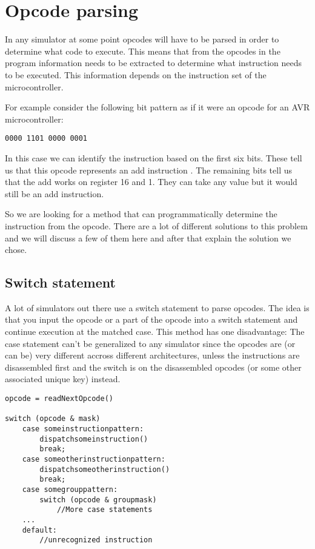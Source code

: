 \section[Opcode parsing]{Opcode parsing}
In any simulator at some point opcodes will have to be parsed in order
to determine what code to execute. This means that from the opcodes in 
the program information needs to be extracted to determine what instruction 
needs to be executed. This information depends on the instruction set of 
the microcontroller. 

For example consider the following bit pattern as if it were an opcode for an AVR
microcontroller:

\lstset{caption=An example opcde}
\begin{lstlisting}
0000 1101 0000 0001
\end{lstlisting}

In this case we can identify the instruction based on the first six bits. These
tell us that this opcode represents an add instruction \cite[p.17]{atmelISA}.
The remaining bits tell us that the add works on register 16 and 1. They can take any
value but it would still be an add instruction.

So we are looking for a method that can programmatically determine the instruction
from the opcode. There are a lot of different solutions to this problem 
and we will discuss a few of them here and after that explain the solution we chose.

\subsection[Switch statement]{Switch statement}
A lot of simulators out there use a switch statement to parse opcodes. The idea
is that you input the opcode or a part of the opcode into a switch
statement and continue execution at the matched case. This method has
one disadvantage: The case statement can't be generalized to any
simulator since the opcodes are (or can be) very different accross
different architectures, unless the instructions are disassembled first and the
switch is on the disassembled opcodes (or some other associated unique key) instead.

\lstset{caption=Example of a switch statement for opcode parsing}
\begin{lstlisting}
opcode = readNextOpcode()

switch (opcode & mask)
	case someinstructionpattern:
		dispatchsomeinstruction()
		break;
	case someotherinstructionpattern:
		dispatchsomeotherinstruction()
		break;
	case somegrouppattern:
		switch (opcode & groupmask)
			//More case statements
	...
	default:
		//unrecognized instruction
\end{lstlisting}

